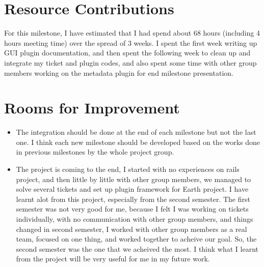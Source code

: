 \documentclass{article}
\begin{document}
\section*{Resource Contributions}

For this milestone, I have estimated that I had spend about 68 hours (including 4 hours meeting time) over the spread of 3 weeks. I spent the first week writing up GUI plugin documentation, and then spent the following week to clean up and integrate my ticket and plugin codes, and also spent some time with other group members working on the metadata plugin for end milestone presentation. 

\section*{Rooms for Improvement}

\begin{itemize}
   \item The integration should be done at the end of each milestone but not the last one. I think each new milestone should be developed based on the works done in previous milestones by the whole project group.
   \item The project is coming to the end, I started with no experiences on rails project, and then little by little with other group members, we managed to solve several tickets and set up plugin framework for Earth project. I have learnt alot from this project, especially from the second semester. The first semester was not very good for me, because I felt I was working on tickets individually, with no communication with other group members, and things changed in second semester, I worked with other group members as a real team, focused on one thing, and worked together to acheive our goal. So, the second semester was the one that we acheived the most. I think what I learnt from the project will be very useful for me in my future work.
\end{itemize}
\end{document}
